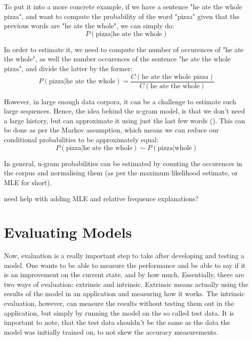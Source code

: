To put it into a more concrete example, if we have a sentence "he ate the whole pizza", and want to compute the probability of the word "pizza" given that the previous words are "he ate the whole", we can simply do:
\begin{equation}
    P(\text{pizza}|\text{he ate the whole})
\end{equation}

In order to estimate it, we need to compute the number of occurences of "he ate the whole", as well the number occurences of the sentence "he ate the whole pizza", and divide the latter by the former:
\begin{equation}
    P(\text{pizza}|\text{he ate the whole})=\frac{C(\text{he ate the whole pizza})}{C(\text{he ate the whole})}
\end{equation}

However, in large enough data corpora, it can be a challenge to estimate such large sequences. Hence, the idea behind the n-gram model, is that we don't need a large history, but can approximate it using just the last few words (\cite{Jura09a}). This can be done as per the Markov assumption, which means we can reduce our conditional probabilities to be approximately equal:
\begin{equation}
    P(\text{pizza}|\text{he ate the whole}) \sim P(\text{pizza}|\text{whole})
\end{equation}

In general, n-gram probabilities can be estimated by counting the occurences in the corpus and normalising them (as per the maximum likelihood estimate, or MLE for short).

need help with adding MLE and relative frequence explanations?

\section{Evaluating Models}
\label{sec:NgramBackground-EvaluatingModels}
Now, evaluation is a really important step to take after developing and testing a model. One wants to be able to measure the performance and be able to say if it is an improvement on the current state, and by how much. Essentially, there are two ways of evaluation: extrinsic and intrinsic. Extrinsic means actually using the results of the model in an application and measuring how it works. The intrinsic evaluation, however, can measure the results without testing them out in the application, but simply by running the model on the so called test data. It is important to note, that the test data shouldn't be the same as the data the model was initially trained on, to not skew the accuracy measurements.

